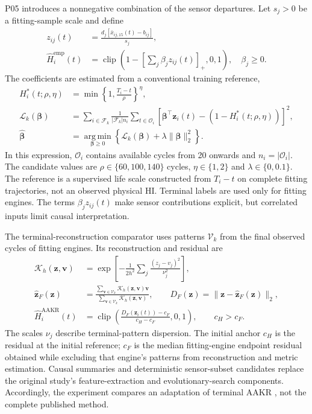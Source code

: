 \documentclass[preprint,12pt]{elsarticle}
\begin{document}
P05 introduces a nonnegative combination of the sensor departures. Let $s_j>0$ be a fitting-sample scale and define
\[
\begin{aligned}
z_{ij}(t)&=\frac{d_j[\bar x_{ij,15}(t)-b_{ij}]}{s_j},\\
\widehat H_i^{\mathrm{emp}}(t)&=
\operatorname{clip}\left(1-\left[\sum_j\beta_jz_{ij}(t)\right]_+,0,1\right),
\quad \beta_j\geq0.
\end{aligned}
\]
The coefficients are estimated from a conventional training reference,
\[
\begin{aligned}
H_i^*(t;\rho,\eta)&=\min\left\{1,\frac{T_i-t}{\rho}\right\}^{\eta},\\
\mathcal L_k(\boldsymbol\beta)&=
\sum_{i\in\mathcal F_k}\frac{1}{|\mathcal F_k|n_i}
\sum_{t\in\mathcal O_i}
\left[\boldsymbol\beta^\top\mathbf z_i(t)-(1-H_i^*(t;\rho,\eta))\right]^2,\\
\widehat{\boldsymbol\beta}&=
\operatorname*{arg\,min}_{\boldsymbol\beta\geq0}
\left\{\mathcal L_k(\boldsymbol\beta)+\lambda\|\boldsymbol\beta\|_2^2\right\}.
\end{aligned}
\]
In this expression, $\mathcal O_i$ contains available cycles from 20 onwards and $n_i=|\mathcal O_i|$. The candidate values are $\rho\in\{60,100,140\}$ cycles, $\eta\in\{1,2\}$ and $\lambda\in\{0,0.1\}$. The reference is a supervised life scale constructed from $T_i-t$ on complete fitting trajectories, not an observed physical HI. Terminal labels are used only for fitting engines. The terms $\beta_jz_{ij}(t)$ make sensor contributions explicit, but correlated inputs limit causal interpretation.

The terminal-reconstruction comparator uses patterns $\mathcal V_k$ from the final observed cycles of fitting engines. Its reconstruction and residual are
\[
\begin{aligned}
\mathcal K_h(\mathbf z,\mathbf v)
&=\exp\left[-\frac{1}{2h^2}\sum_j\frac{(z_j-v_j)^2}{\nu_j^2}\right],\\
\widehat{\mathbf z}_F(\mathbf z)
&=\frac{\sum_{\mathbf v\in\mathcal V_k}\mathcal K_h(\mathbf z,\mathbf v)\mathbf v}
{\sum_{\mathbf v\in\mathcal V_k}\mathcal K_h(\mathbf z,\mathbf v)},\qquad
D_F(\mathbf z)=\|\mathbf z-\widehat{\mathbf z}_F(\mathbf z)\|_2,\\
\widehat H_i^{\mathrm{AAKR}}(t)
&=\operatorname{clip}\left(\frac{D_F(\mathbf z_i(t))-c_F}{c_H-c_F},0,1\right),
\qquad c_H>c_F.
\end{aligned}
\]
The scales $\nu_j$ describe terminal-pattern dispersion. The initial anchor $c_H$ is the residual at the initial reference; $c_F$ is the median fitting-engine endpoint residual obtained while excluding that engine's patterns from reconstruction and metric estimation. Causal summaries and deterministic sensor-subset candidates replace the original study's feature-extraction and evolutionary-search components. Accordingly, the experiment compares an adaptation of terminal AAKR \cite{Baraldi2018HI}, not the complete published method.
\end{document}
